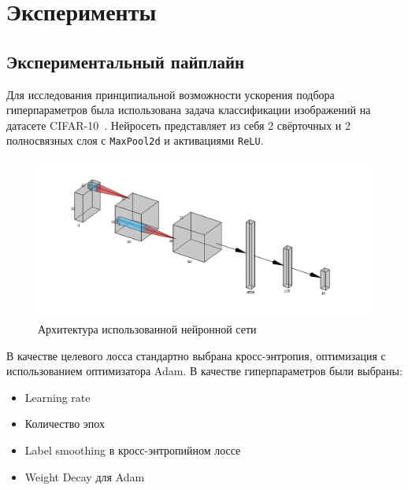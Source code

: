 \section{Эксперименты}
\subsection*{Экспериментальный пайплайн}
Для исследования принципиальной возможности ускорения подбора гиперпараметров была использована задача классификации изображений на датасете CIFAR-10~\cite{krizhevsky2009learning}.
Нейросеть представляет из себя 2 свёрточных и 2 полносвязных слоя с \verb|MaxPool2d| и активациями \verb|ReLU|.
\begin{figure}[ht]
    \centering
    \includegraphics*[width=\linewidth]{imgs/net.png}
    \caption{Архитектура использованной нейронной сети}
\end{figure}
В качестве целевого лосса стандартно выбрана кросс-энтропия, оптимизация с использованием оптимизатора Adam.
В качестве гиперпараметров были выбраны:
\begin{itemize}
    \item Learning rate
    \item Количество эпох
    \item Label smoothing в кросс-энтропийном лоссе
    \item Weight Decay для Adam
\end{itemize}

